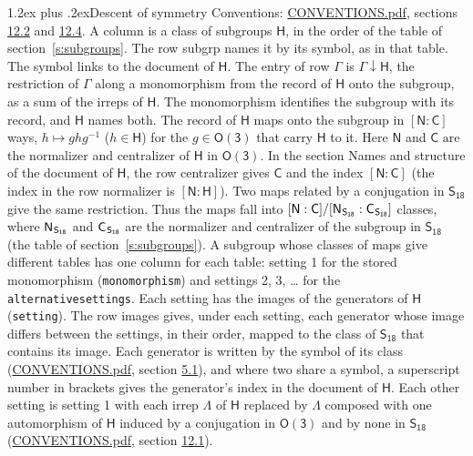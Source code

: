 \documentclass[10pt,a4paper]{article}
\makeatletter
\renewcommand\section{\@startsection{section}{1}{\z@}{-3ex plus -1ex minus -.2ex}%
  {1.2ex plus .2ex}{\normalfont\large\sffamily\bfseries\color{parttitle}}}
\numberwithin{equation}{section}
\newcommand{\grp}[1]{\mathsf{#1}}
\newcommand{\grpindex}[2]{[#1 : #2]}
\newcommand{\restr}[2]{#1\!\downarrow#2}
\newcommand{\hairsp}{\mkern1mu}
\makeatother
\begin{document}
\section{Descent of symmetry}\label{s:subduction}
Conventions: \href{../../CONVENTIONS.pdf}{CONVENTIONS.pdf}, sections \href{../../CONVENTIONS.pdf\#conv.12.2}{12.2} and \href{../../CONVENTIONS.pdf\#conv.12.4}{12.4}.
A column is a class of subgroups $\grp{H}$, in the order of the table of section~\ref{s:subgroups}. The row subgrp names it by its symbol, as in that table. The symbol links to the document of $\grp{H}$. The entry of row $\Gamma$ is $\restr{\Gamma}{\grp{H}}$, the restriction of $\Gamma$ along a monomorphism from the record of $\grp{H}$ onto the subgroup, as a sum of the irreps of $\grp{H}$. The monomorphism identifies the subgroup with its record, and $\grp{H}$ names both. \label{n:group.normalizer.o3}\label{n:group.centralizer.o3}The record of $\grp{H}$ maps onto the subgroup in $\grpindex{\grp{N}}{\grp{C}}$ ways, $h \mapsto g h g^{-1}$ ($h \in \grp{H}$) for the $g \in \grp{O(3)}$ that carry $\grp{H}$ to it. Here $\grp{N}$ and $\grp{C}$ are the normalizer and centralizer of $\grp{H}$ in \href{O3.pdf}{$\grp{O(3)}$}. In the section Names and structure of the document of $\grp{H}$, the row centralizer gives $\grp{C}$ and the index $\grpindex{\grp{N}}{\grp{C}}$ (the index in the row normalizer is $\grpindex{\grp{N}}{\grp{H}}$). Two maps related by a conjugation in $\grp{S_{18}}$ give the same restriction. Thus the maps fall into $\grpindex{\grp{N}}{\grp{C}}/\grpindex{\grp{N}_{\hairsp \grp{S_{18}}}}{\grp{C}_{\hairsp \grp{S_{18}}}}$ classes, where $\grp{N}_{\hairsp \grp{S_{18}}}$ and $\grp{C}_{\hairsp \grp{S_{18}}}$ are the normalizer and centralizer of the subgroup in $\grp{S_{18}}$ (the table of section~\ref{s:subgroups}). \label{n:head.setting}A subgroup whose classes of maps give different tables has one column for each table: setting 1 for the stored monomorphism (\texttt{monomorphism}) and settings 2, 3, \dots{} for the \texttt{alternativesettings}. Each setting has the images of the generators of $\grp{H}$ (\texttt{setting}). \label{n:head.images}The row images gives, under each setting, each generator whose image differs between the settings, in their order, mapped to the class of $\grp{S_{18}}$ that contains its image. Each generator is written by the symbol of its class (\href{../../CONVENTIONS.pdf}{CONVENTIONS.pdf}, section \href{../../CONVENTIONS.pdf\#conv.5.1}{5.1}), and where two share a symbol, a superscript number in brackets gives the generator's index in the document of $\grp{H}$. \label{n:irrep.Delta}Each other setting is setting 1 with each irrep $\Lambda$ of $\grp{H}$ replaced by $\Lambda$ composed with one automorphism of $\grp{H}$ induced by a conjugation in \href{O3.pdf}{$\grp{O(3)}$} and by none in $\grp{S_{18}}$ (\href{../../CONVENTIONS.pdf}{CONVENTIONS.pdf}, section \href{../../CONVENTIONS.pdf\#conv.12.1}{12.1}).
\end{document}
